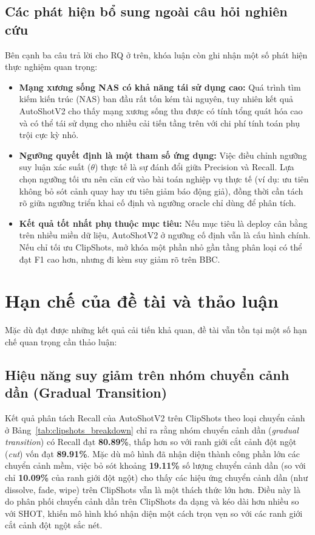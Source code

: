 \subsection{Các phát hiện bổ sung ngoài câu hỏi nghiên cứu}
Bên cạnh ba câu trả lời cho RQ ở trên, khóa luận còn ghi nhận một số phát hiện thực nghiệm quan trọng:
\begin{itemize}
    \item \textbf{Mạng xương sống NAS có khả năng tái sử dụng cao:} Quá trình tìm kiếm kiến trúc (NAS) ban đầu rất tốn kém tài nguyên, tuy nhiên kết quả AutoShotV2 cho thấy mạng xương sống thu được có tính tổng quát hóa cao và có thể tái sử dụng cho nhiều cải tiến tầng trên với chi phí tính toán phụ trội cực kỳ nhỏ.
    \item \textbf{Ngưỡng quyết định là một tham số ứng dụng:} Việc điều chỉnh ngưỡng suy luận xác suất ($\theta$) thực tế là sự đánh đổi giữa Precision và Recall. Lựa chọn ngưỡng tối ưu nên căn cứ vào bài toán nghiệp vụ thực tế (ví dụ: ưu tiên không bỏ sót cảnh quay hay ưu tiên giảm báo động giả), đồng thời cần tách rõ giữa ngưỡng triển khai cố định và ngưỡng oracle chỉ dùng để phân tích.
    \item \textbf{Kết quả tốt nhất phụ thuộc mục tiêu:} Nếu mục tiêu là deploy cân bằng trên nhiều miền dữ liệu, AutoShotV2 ở ngưỡng cố định vẫn là cấu hình chính. Nếu chỉ tối ưu ClipShots, mở khóa một phần nhỏ gần tầng phân loại có thể đạt F1 cao hơn, nhưng đi kèm suy giảm rõ trên BBC.
\end{itemize}

\section{Hạn chế của đề tài và thảo luận}
\label{sec:limitations}

Mặc dù đạt được những kết quả cải tiến khả quan, đề tài vẫn tồn tại một số hạn chế quan trọng cần thảo luận:

\subsection{Hiệu năng suy giảm trên nhóm chuyển cảnh dần (Gradual Transition)}
Kết quả phân tách Recall của AutoShotV2 trên ClipShots theo loại chuyển cảnh ở Bảng~\ref{tab:clipshots_breakdown} chỉ ra rằng nhóm chuyển cảnh dần (\textit{gradual transition}) có Recall đạt \textbf{80.89\%}, thấp hơn so với ranh giới cắt cảnh đột ngột (\textit{cut}) vốn đạt \textbf{89.91\%}. Mặc dù mô hình đã nhận diện thành công phần lớn các chuyển cảnh mềm, việc bỏ sót khoảng \textbf{19.11\%} số lượng chuyển cảnh dần (so với chỉ \textbf{10.09\%} của ranh giới đột ngột) cho thấy các hiệu ứng chuyển cảnh dần (như dissolve, fade, wipe) trên ClipShots vẫn là một thách thức lớn hơn. Điều này là do phân phối chuyển cảnh dần trên ClipShots đa dạng và kéo dài hơn nhiều so với SHOT, khiến mô hình khó nhận diện một cách trọn vẹn so với các ranh giới cắt cảnh đột ngột sắc nét.

